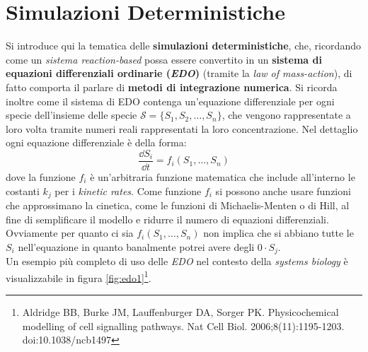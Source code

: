 \documentclass[a4paper,12pt, oneside]{book}
\begin{document}
\section{Simulazioni Deterministiche}
Si introduce qui la tematica delle \textbf{simulazioni deterministiche}, che,
ricordando come un \textit{sistema reaction-based} possa essere convertito in un
\textbf{sistema di equazioni differenziali ordinarie (\textit{EDO})} (tramite la
\textit{law of mass-action}), di fatto comporta il parlare di \textbf{metodi di
  integrazione numerica}. Si ricorda inoltre come il sistema di EDO contenga
un'equazione differenziale per ogni specie dell'insieme delle specie
$\mathcal{S} = \{S_1,S_2,\ldots, S_n\}$, che vengono rappresentate a loro volta
tramite numeri reali 
rappresentati la loro concentrazione. Nel dettaglio ogni equazione differenziale
è della forma:
\[\frac{\dd{S_i}}{\dd{t}}=f_i(S_1,\ldots,S_n)\]
dove la funzione $f_i$ è un'arbitraria funzione matematica che include
all'interno le costanti $k_j$ per i \textit{kinetic rates}. Come funzione $f_i$
si possono anche usare funzioni che approssimano la cinetica, come le funzioni
di Michaelis-Menten o di Hill, al fine di semplificare il modello e ridurre il
numero di equazioni differenziali. Ovviamente per quanto ci sia
$f_i(S_1,\ldots,S_n)$ non implica che si abbiano tutte le $S_i$ nell'equazione
in quanto banalmente potrei avere degli $0\cdot S_j$.\\
Un esempio più completo di uso delle \textit{EDO} nel contesto della
\textit{systems biology} è visualizzabile in figura 
\ref{fig:edo1}\footnote{Aldridge BB, Burke JM, Lauffenburger DA, Sorger
  PK. Physicochemical modelling of cell signalling pathways. Nat Cell
  Biol. 2006;8(11):1195-1203. doi:10.1038/ncb1497}.
\end{document}
